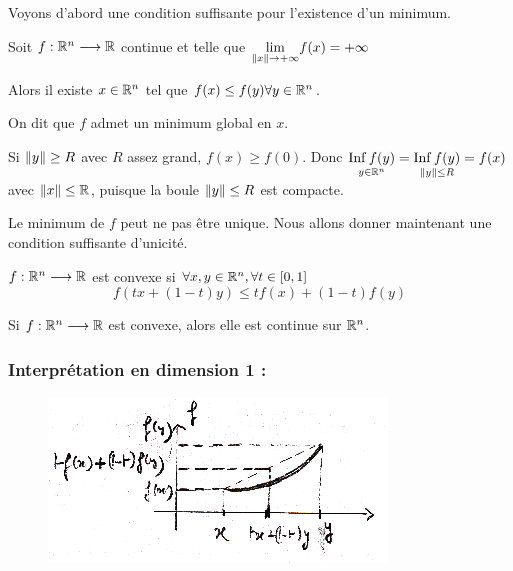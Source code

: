 Voyons d'abord une condition suffisante pour l'existence d'un minimum.

\begin{ftheo}
    Soit $f : \mathbb{R}^n \longrightarrow \mathbb{R}$ continue et telle que $\underset{\left\lVert x\right\rVert \to +\infty}{\lim} f(x) = + \infty$

    Alors il existe $x \in \mathbb{R}^n$ tel que $f(x) \leq f(y) \forall y \in \mathbb{R}^n$.
\end{ftheo}

\begin{remark}
    On dit que $f$ admet un minimum global en $x$.
\end{remark}

\begin{preuve}
    Si $\left\lVert y\right\rVert \geq R$ avec $R$ assez grand, $f(x) \geq f(0)$.
    Donc $\underset{y \in \mathbb{R}^n}{\operatorname{Inf} f(y)} = \underset{\left\lVert y\right\rVert \leq R}{\operatorname{Inf} f(y)} = f(x)$ avec $\left\lVert x\right\rVert \leq \mathbb{R}$, puisque la boule $\left\lVert y\right\rVert \leq R$ est compacte.
\end{preuve}

Le minimum de $f$ peut ne pas être unique. Nous allons donner maintenant une condition
suffisante d'unicité.

\begin{fdef}
    $f : \mathbb{R}^n \longrightarrow \mathbb{R}$ est convexe si $\forall x,y \in \mathbb{R}^n, \forall t \in [0,1]$
    \[
        f(tx + (1-t)y) \leq tf(x) + (1-t)f(y)
    \]
\end{fdef}

\begin{remark}
    Si $f : \mathbb{R}^n \longrightarrow \mathbb{R}$ est convexe, alors elle est continue sur $\mathbb{R}^n$.
\end{remark}

\subsubsection*{Interprétation en dimension 1 :}
\begin{figure}[h]
    \centering
    \includegraphics[scale=0.7]{7optim-dim1-convexe.png}
    \label{fig:7optim-dim1-convexe}
\end{figure}


